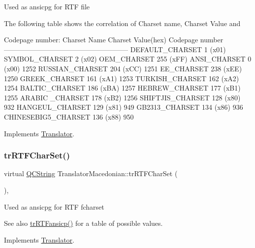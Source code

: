Used as ansicpg for R\+TF file

The following table shows the correlation of Charset name, Charset Value and 
\begin{DoxyPre}
Codepage number:
Charset Name       Charset Value(hex)  Codepage number
------------------------------------------------------
DEFAULT\_CHARSET           1 (x01)
SYMBOL\_CHARSET            2 (x02)
OEM\_CHARSET             255 (xFF)
ANSI\_CHARSET              0 (x00)            1252
RUSSIAN\_CHARSET         204 (xCC)            1251
EE\_CHARSET              238 (xEE)            1250
GREEK\_CHARSET           161 (xA1)            1253
TURKISH\_CHARSET         162 (xA2)            1254
BALTIC\_CHARSET          186 (xBA)            1257
HEBREW\_CHARSET          177 (xB1)            1255
ARABIC \_CHARSET         178 (xB2)            1256
SHIFTJIS\_CHARSET        128 (x80)             932
HANGEUL\_CHARSET         129 (x81)             949
GB2313\_CHARSET          134 (x86)             936
CHINESEBIG5\_CHARSET     136 (x88)             950
\end{DoxyPre}
 

Implements \mbox{\hyperlink{class_translator_a9953a4c0e6a4fc7d017abcd5c2939e0f}{Translator}}.

\mbox{\label{class_translator_macedonian_af41f21189cd807211d8fa27b5d1cac61}} 
\subsubsection{\texorpdfstring{trRTFCharSet()}{trRTFCharSet()}}
{\footnotesize\ttfamily virtual \mbox{\hyperlink{class_q_c_string}{Q\+C\+String}} Translator\+Macedonian\+::tr\+R\+T\+F\+Char\+Set (\begin{DoxyParamCaption}{ }\end{DoxyParamCaption})\hspace{0.3cm}{\ttfamily [inline]}, {\ttfamily [virtual]}}

Used as ansicpg for R\+TF fcharset \begin{DoxySeeAlso}{See also}
\mbox{\hyperlink{class_translator_macedonian_aeabb5a992e4d426dde01bb32a89755dc}{tr\+R\+T\+Fansicp()}} for a table of possible values. 
\end{DoxySeeAlso}


Implements \mbox{\hyperlink{class_translator_afad391f3cbfb5ce6332b7239f8e2049a}{Translator}}.

